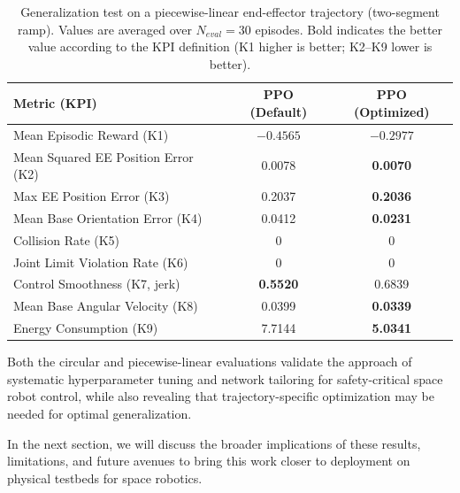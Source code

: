 \documentclass{ieeeaccess}
\begin{document}
\begin{table}[!b]
\centering
\caption{Generalization test on a piecewise-linear end-effector trajectory (two-segment ramp). Values are 
averaged over $N_{eval}=30$ episodes. Bold indicates the better value according to the KPI definition (K1 higher is better; K2--K9 lower is better).}
\label{tab:ppo_linear_kpi}
\renewcommand{\arraystretch}{1.2}
\setlength{\tabcolsep}{3pt}
\begin{tabular}{lcc}
\toprule
\textbf{Metric (KPI)} & \textbf{PPO (Default)} & \textbf{PPO (Optimized)} \\
\midrule
Mean Episodic Reward (K1)            & $-0.4565$ & $\mathbf{-0.2977}$ \\
Mean Squared EE Position Error (K2)  & 0.0078 & \textbf{0.0070} \\
Max EE Position Error (K3)           & 0.2037 & \textbf{0.2036} \\
Mean Base Orientation Error (K4)     & 0.0412 & \textbf{0.0231} \\
Collision Rate (K5)                 & 0 & 0 \\
Joint Limit Violation Rate (K6)     & 0 & 0 \\
Control Smoothness (K7, jerk)       & \textbf{0.5520} & 0.6839 \\
Mean Base Angular Velocity (K8)      & 0.0399 & \textbf{0.0339} \\
Energy Consumption (K9)              & 7.7144 & \textbf{5.0341} \\
\bottomrule
\end{tabular}
\end{table}


Both the circular and piecewise-linear evaluations validate the approach of systematic hyperparameter tuning 
and network tailoring for safety-critical space robot control, while also revealing that trajectory-specific 
optimization may be needed for optimal generalization.

In the next section, we will discuss the broader implications of these results, limitations, and future
avenues to bring this work closer to deployment on physical testbeds for space robotics.
\end{document}
